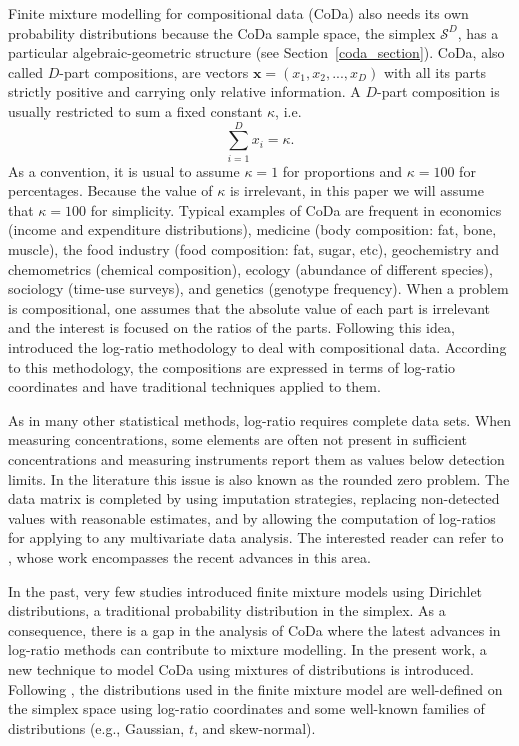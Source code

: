 \documentclass[12pt, a4paper]{article}
\begin{document}
Finite mixture modelling for compositional data (CoDa) also needs its own probability distributions because the CoDa sample space, the simplex $\mathcal{S}^D$, has a particular algebraic-geometric structure (see Section~\ref{coda_section}).
CoDa, also called $D$-part compositions, are vectors $\textbf{x} = (x_1, x_2, ..., x_D)$ with all its parts strictly positive  and carrying only relative information. A $D$-part composition is usually restricted to sum a fixed constant $\kappa$, i.e.
\begin{equation}
\sum_{i=1 }^D x_i = \kappa.
\label{sum_to_constant}
\end{equation}
As a convention, it is usual to assume $\kappa =1$ for proportions and $\kappa = 100$ for percentages. Because the value of $\kappa$ is irrelevant, in this paper we will assume that $\kappa = 100$ for simplicity. Typical examples of CoDa are frequent in economics (income and expenditure distributions), medicine (body composition: fat, bone, muscle), the food industry (food composition: fat, sugar, etc), geochemistry and chemometrics (chemical composition), ecology (abundance of different species), sociology (time-use surveys), and genetics (genotype frequency). 
When a problem is compositional, one assumes that the absolute value of each part is irrelevant and the interest is focused on the ratios of the parts. Following this idea, \cite{aitchison1986statistical} introduced the log-ratio methodology to deal with compositional data. According to this methodology, the compositions are expressed in terms of log-ratio coordinates and have traditional techniques applied to them.

As in many other statistical methods, log-ratio requires complete data sets. When measuring concentrations, some elements are often not present in sufficient concentrations and measuring instruments report them as values below detection limits. In the literature this issue is also known as the rounded zero problem. The data matrix is completed by using imputation strategies, replacing non-detected values with reasonable estimates, and by allowing the computation of log-ratios for applying to any multivariate data analysis. The interested reader can refer to \cite{palarea2014compositional}, whose work encompasses the recent advances in this area.

In the past, very few studies \citep[e.g.,][]{albert1982mixtures, bouguila2004unsupervised} introduced finite mixture models using Dirichlet distributions, a traditional probability distribution in the simplex. As a consequence, there is a gap in the analysis of CoDa where the latest advances in log-ratio methods can contribute to mixture modelling. In the present work, a new technique to model CoDa using mixtures of distributions is introduced. Following \cite{mateu2013normal}, the distributions used in the finite mixture model are well-defined on the simplex space using log-ratio coordinates and some well-known families of distributions (e.g., Gaussian, $t$, and skew-normal).
\end{document}
